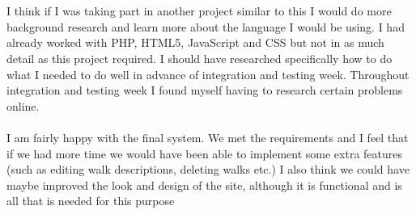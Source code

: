 \documentclass[12pt]{article}
\begin{document}
~\\\\
I think if I was taking part in another project similar to this I would do more background research and learn more about the language I would be using. I had already worked with PHP, HTML5, JavaScript and CSS but not in as much detail as this project required. I should have researched specifically how to do what I needed to do well in advance of integration and testing week. Throughout integration and testing week I found myself having to research certain problems online. ~\\\\
I am fairly happy with the final system. We met the requirements and I feel that if we
had more time we would have been able to implement some extra features (such as
editing walk descriptions, deleting walks etc.) I also think we could have maybe
improved the look and design of the site, although it is functional and is all that is
needed for this purpose
\end{document}
